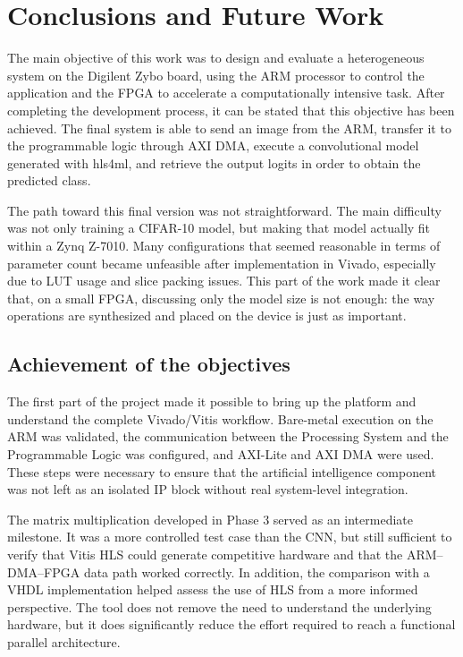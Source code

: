\chapter*{Conclusions and Future Work}
\label{cap:conclusions}

The main objective of this work was to design and evaluate a heterogeneous system on the
Digilent Zybo board, using the \ac{ARM} processor to control the application and the \ac{FPGA} to
accelerate a computationally intensive task. After completing the development process,
it can be stated that this objective has been achieved. The final system is able to send
an image from the \ac{ARM}, transfer it to the programmable logic through \ac{AXI}
\ac{DMA}, execute a
convolutional model generated with hls4ml, and retrieve the output logits in order to
obtain the predicted class.

The path toward this final version was not straightforward. The main difficulty was not
only training a \ac{CIFAR}-10 model, but making that model actually fit within a Zynq Z-7010.
Many configurations that seemed reasonable in terms of parameter count became unfeasible
after implementation in Vivado, especially due to \ac{LUT} usage and slice packing issues.
This part of the work made it clear that, on a small \ac{FPGA}, discussing only the model size
is not enough: the way operations are synthesized and placed on the device is just as
important.

\section*{Achievement of the objectives}
The first part of the project made it possible to bring up the platform and understand
the complete Vivado/Vitis workflow. Bare-metal execution on the \ac{ARM} was validated, the
communication between the Processing System and the Programmable Logic was configured,
and \ac{AXI}-Lite and AXI \ac{DMA} were used. These steps were necessary to ensure that the
artificial intelligence component was not left as an isolated \ac{IP} block without real
system-level integration.

The matrix multiplication developed in Phase 3 served as an intermediate milestone. It
was a more controlled test case than the \ac{CNN}, but still sufficient to verify that Vitis
\ac{HLS} could generate competitive hardware and that the \ac{ARM}--\ac{DMA}--\ac{FPGA}
data path worked
correctly. In addition, the comparison with a \ac{VHDL} implementation helped assess the use
of \ac{HLS} from a more informed perspective. The tool does not remove the need to understand
the underlying hardware, but it does significantly reduce the effort required to reach a
functional parallel architecture.

